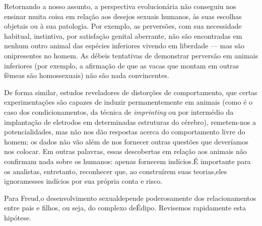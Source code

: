  Retornando a nosso assunto, a perspectiva evolucionária não conseguiu
nos ensinar muita coisa em relação aos desejos sexuais humanos, às suas
escolhas objetais ou à sua patologia. Por exemplo, as perversões, com
sua necessidade habitual, instintiva, por satisfação genital aberrante,
não são encontradas em nenhum outro animal das espécies inferiores
vivendo em liberdade --- mas são onipresentes no homem. As débeis
tentativas de demonstrar perversão em animais inferiores (por exemplo,
a afirmação de que as vacas que montam em outras fêmeas são
homossexuais) não são nada convincentes.

 De forma similar, estudos reveladores de distorções de comportamento,
que certas experimentações são capazes de induzir permanentemente em
animais (como é o caso dos condicionamentos,\idxcond{} da técnica de
\textit{imprinting}\idxestam{} ou por intermédio da
implantação de eletrodos em determinadas estruturas do cérebro),
remetem-nos a potencialidades, mas não nos dão respostas acerca do
comportamento livre do homem; os dados não vão além de nos fornecer
outras questões que deveríamos nos colocar. Em outras palavras, essas
descobertas em relação aos animais não confirmam nada sobre os humanos:
apenas fornecem indícios.\idxanimvers[|)] É importante para os analistas, entretanto,
reconhecer que, ao construírem suas teorias,\idxcereb[|)] eles ignoram\idxsexui[|)] esses
indícios por sua própria conta e risco.

 Para Freud,\idxfreud[|(] o desenvolvimento sexual\idxinfansexua[|)] depende poderosamente dos
relacionamentos entre pais e filhos, ou seja, do complexo de\idxconfe[|(] Édipo.\idxmascucon{} Revisemos rapidamente esta hipótese.


